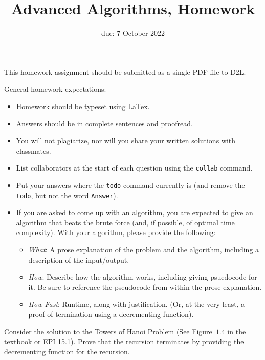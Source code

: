 \documentclass{article}
\title{Advanced Algorithms, Homework \hwnum}
\author{\todo{Your Name Here}}
\date{due: 7 October 2022}
\begin{document}
\maketitle

This homework assignment should be
submitted as a single PDF file to D2L.

General homework expectations:
\begin{itemize}
    \item Homework should be typeset using LaTex.
    \item Answers should be in complete sentences and proofread.
    \item You will not plagiarize, nor will you share your written solutions
        with classmates.
    \item List collaborators at the start of each question using the
        \texttt{collab} command.
    \item Put your answers where the \texttt{todo} command currently is (and
        remove the \texttt{todo}, but not the word \texttt{Answer}).
    \item If you are asked to come up with an algorithm, you are
        expected to give an algorithm that beats the brute force (and, if possible, of
        optimal time complexity). With your algorithm, please provide the following:
        \begin{itemize}
            \item \emph{What}: A prose explanation of the problem and the algorithm,
                including a description of the input/output.
            \item \emph{How}: Describe how the algorithm works, including giving
                psuedocode for it.  Be sure to reference the pseudocode
                from within the prose explanation.
            \item \emph{How Fast}: Runtime, along with justification.  (Or, at
                the very least, a proof of termination using a decrementing function).
        \end{itemize}

\end{itemize}


\nextprob{}
Consider the solution to the Towers of Hanoi Problem (See Figure~$1.4$ in the
textbook or EPI 15.1).  Prove that the recursion terminates by providing the
decrementing function for the recursion.
\end{document}
